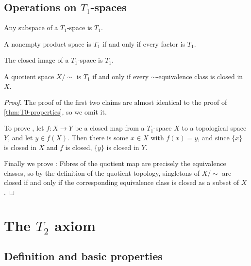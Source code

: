\documentclass[article, a4paper, 11pt, oneside]{memoir}
\numberwithin{equation}{chapter}
\begin{document}
\section[Operations on T1-spaces]{Operations on $T_1$-spaces}

\begin{proposition}
    \label{thm:T1-properties}
    \begin{enumprop}
        \item \label{enum:T1-subspace} Any subspace of a $T_1$-space is $T_1$.
        \item A nonempty product space is $T_1$ if and only if every factor is $T_1$.
        \item \label{enum:T1-closed-image} The closed image\footnotemark{} of a $T_1$-space is $T_1$.
        \item \label{enum:T1-quotient} A quotient space $X/{\sim}$ is $T_1$ if and only if every $\sim$-equivalence class is closed in $X$.
    \end{enumprop}
\end{proposition}

\begin{proof}
    The proof of the first two claims are almost identical to the proof of \cref{thm:T0-properties}, so we omit it.

    To prove , let $f \colon X \to Y$ be a closed map from a $T_1$-space $X$ to a topological space $Y$, and let $y \in f(X)$. Then there is some $x \in X$ with $f(x) = y$, and since $\{x\}$ is closed in $X$ and $f$ is closed, $\{y\}$ is closed in $Y$.

    Finally we prove : Fibres of the quotient map are precisely the equivalence classes, so by the definition of the quotient topology, singletons of $X/{\sim}$ are closed if and only if the corresponding equivalence class is closed as a subset of $X$.
\end{proof}



\chapter[The T2 axiom]{The $T_2$ axiom}

\section{Definition and basic properties}
\end{document}
